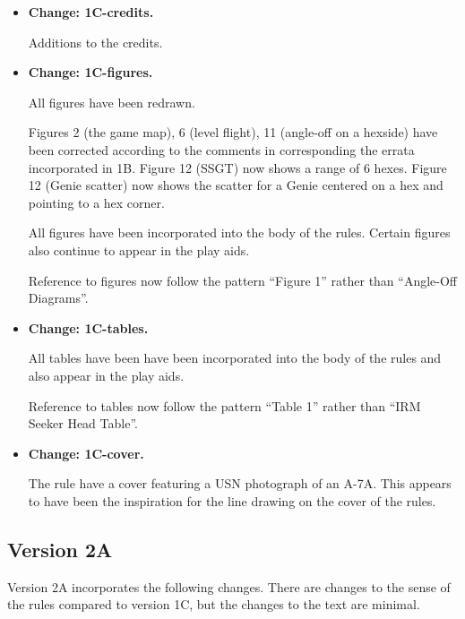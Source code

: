 \documentclass[10pt]{article}
\newcommand{\itemtag}[1]{\item \textbf{Change: #1.}\par}
\begin{document}
\begin{itemize}
    \itemtag{1C-credits} Additions to the credits.

    \itemtag{1C-figures} All figures have been redrawn. 
    
    Figures 2 (the game map), 6 (level flight), 11 (angle-off on a hexside) have been corrected according to the comments in corresponding the errata incorporated in 1B. Figure 12 (SSGT) now shows a range of 6 hexes. Figure 12 (Genie scatter) now shows the scatter for a Genie centered on a hex and pointing to a hex corner.
    
    All figures have been incorporated into the body of the rules. Certain figures also continue to appear in the play aids.
    
    Reference to figures now follow the pattern “Figure 1” rather than “Angle-Off Diagrams”.

    \itemtag{1C-tables} All tables have been have been incorporated into the body of the rules and also appear in the play aids. 
    
    Reference to tables now follow the pattern “Table 1” rather than “IRM Seeker Head Table”.

    \itemtag{1C-cover} The rule have a cover featuring a USN photograph of an A-7A. This appears to have been the inspiration for the line drawing on the cover of the {\TSOH} rules.

\end{itemize}

\subsection{Version 2A}

Version 2A incorporates the following changes. There are changes to the sense of the rules compared to version 1C, but the changes to the text are minimal.
\end{document}
